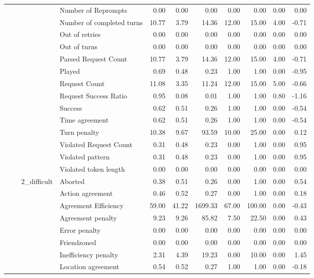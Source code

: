 \begin{tabular}{llllrrrrrrr}
 &  &  & Number of Reprompts & 0.00 & 0.00 & 0.00 & 0.00 & 0.00 & 0.00 & 0.00 \\
 &  &  & Number of completed turns & 10.77 & 3.79 & 14.36 & 12.00 & 15.00 & 4.00 & -0.71 \\
 &  &  & Out of retries & 0.00 & 0.00 & 0.00 & 0.00 & 0.00 & 0.00 & 0.00 \\
 &  &  & Out of turns & 0.00 & 0.00 & 0.00 & 0.00 & 0.00 & 0.00 & 0.00 \\
 &  &  & Parsed Request Count & 10.77 & 3.79 & 14.36 & 12.00 & 15.00 & 4.00 & -0.71 \\
 &  &  & Played & 0.69 & 0.48 & 0.23 & 1.00 & 1.00 & 0.00 & -0.95 \\
 &  &  & Request Count & 11.08 & 3.35 & 11.24 & 12.00 & 15.00 & 5.00 & -0.66 \\
 &  &  & Request Success Ratio & 0.95 & 0.08 & 0.01 & 1.00 & 1.00 & 0.80 & -1.16 \\
 &  &  & Success & 0.62 & 0.51 & 0.26 & 1.00 & 1.00 & 0.00 & -0.54 \\
 &  &  & Time agreement & 0.62 & 0.51 & 0.26 & 1.00 & 1.00 & 0.00 & -0.54 \\
 &  &  & Turn penalty & 10.38 & 9.67 & 93.59 & 10.00 & 25.00 & 0.00 & 0.12 \\
 &  &  & Violated Request Count & 0.31 & 0.48 & 0.23 & 0.00 & 1.00 & 0.00 & 0.95 \\
 &  &  & Violated pattern & 0.31 & 0.48 & 0.23 & 0.00 & 1.00 & 0.00 & 0.95 \\
 &  &  & Violated token length & 0.00 & 0.00 & 0.00 & 0.00 & 0.00 & 0.00 & 0.00 \\
\cline{3-11}
 &  & \multirow[t]{27}{*}{2_difficult} & Aborted & 0.38 & 0.51 & 0.26 & 0.00 & 1.00 & 0.00 & 0.54 \\
 &  &  & Action agreement & 0.46 & 0.52 & 0.27 & 0.00 & 1.00 & 0.00 & 0.18 \\
 &  &  & Agreement Efficiency & 59.00 & 41.22 & 1699.33 & 67.00 & 100.00 & 0.00 & -0.43 \\
 &  &  & Agreement penalty & 9.23 & 9.26 & 85.82 & 7.50 & 22.50 & 0.00 & 0.43 \\
 &  &  & Error penalty & 0.00 & 0.00 & 0.00 & 0.00 & 0.00 & 0.00 & 0.00 \\
 &  &  & Friendzoned & 0.00 & 0.00 & 0.00 & 0.00 & 0.00 & 0.00 & 0.00 \\
 &  &  & Inefficiency penalty & 2.31 & 4.39 & 19.23 & 0.00 & 10.00 & 0.00 & 1.45 \\
 &  &  & Location agreement & 0.54 & 0.52 & 0.27 & 1.00 & 1.00 & 0.00 & -0.18 \\

\end{tabular}
